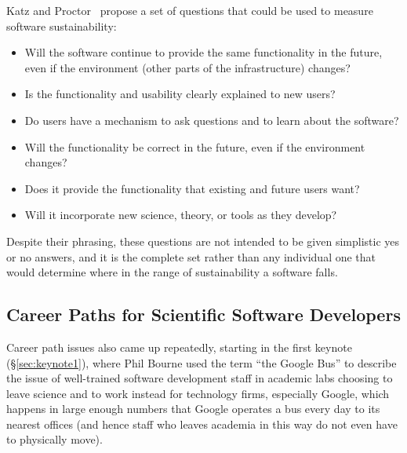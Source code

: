 \documentclass[11pt, oneside]{amsart}
\newcommand{\note}[1]{ {\textcolor{red}    { #1 }}}
\begin{document}
Katz and Proctor~\cite{Katz_WSSSPE} propose a set of questions that
could be used to measure software sustainability:
\begin{itemize}
\item Will the software continue to provide the same functionality in
  the future, even if the environment (other parts of the
  infrastructure) changes?
\item Is the functionality and usability clearly explained to new
  users?
\item Do users have a mechanism to ask questions and to learn about
  the software?
\item Will the functionality be correct in the future, even if the
  environment changes?
\item Does it provide the functionality that existing and future users
  want?
\item Will it incorporate new science, theory, or tools as they
  develop?
\end{itemize}
Despite their phrasing, these questions are not intended to be given
simplistic yes or no answers, and it is the complete set rather than
any individual one that would determine where in the range of
sustainability a software falls.


\subsection{Career Paths for Scientific Software Developers}\label{sec:career-tracks} %

Career path issues also came up repeatedly, starting in the first
keynote (\S\ref{sec:keynote1}), where Phil Bourne used the term ``the
Google Bus'' to describe the issue of well-trained software
development staff in academic labs choosing to leave science and to
work instead for technology firms, especially Google, which happens in
large enough numbers that Google operates a bus every day to its
nearest offices (and hence staff who leaves academia in this way do
not even have to physically move).
\end{document}
